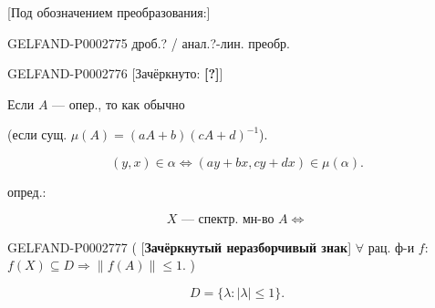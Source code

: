 [Под обозначением преобразования:]

\begin{GelfandAdjacentEvidence}{GELFAND-P000277}{5}
дроб.? / анал.?-лин. преобр.

\end{GelfandAdjacentEvidence}


\begin{center}\end{center}





\begin{GelfandAdjacentEvidence}{GELFAND-P000277}{6}
[Зачёркнуто: \textbf{[?]}]

\end{GelfandAdjacentEvidence}


Если $A$ --- опер., то как обычно

(если сущ. $\mu(A)=(aA+b)(cA+d)^{-1}$).

\begin{equation*}(y,x)\in\alpha\Longleftrightarrow(ay+bx,cy+dx)\in\mu(\alpha).\end{equation*}

опред.:

\begin{equation*}X\text{ --- спектр. мн-во }A\Longleftrightarrow\end{equation*}

\begin{GelfandAdjacentEvidence}{GELFAND-P000277}{7}
( [\textbf{Зачёркнутый неразборчивый знак}] $\forall$ рац. ф-и $f$: $f(X)\subseteq D\Rightarrow\|f(A)\|\le1$. )

\end{GelfandAdjacentEvidence}


\begin{equation*}D=\{\lambda:|\lambda|\le1\}.\end{equation*}

